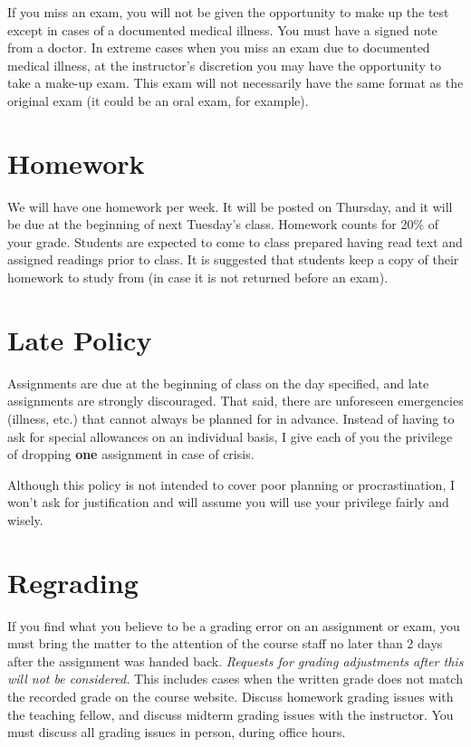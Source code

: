 \documentclass[11pt]{article}
\begin{document}
If you miss an exam, you will not be given the opportunity to make up the test
except in cases of a documented medical illness.  You must have a signed note
from a doctor.  In extreme cases when you miss an exam due to documented
medical illness, at the instructor's discretion you may have the opportunity
to take a make-up exam.  This exam will not necessarily have the same format
as the original exam (it could be an oral exam, for example).

\section*{Homework}
We will have one homework per week. It will be posted on Thursday, and it will be due at the beginning of next Tuesday's class. 
Homework counts for 20\% of your grade.  
Students are expected to come to class prepared having read text and assigned
readings prior to class. It is
suggested that students keep a copy of their homework to study from (in case
it is not returned before an exam). 


\section*{Late Policy}

Assignments are due at the beginning of class on the day specified, and late
assignments are strongly discouraged.  That said, there are unforeseen
emergencies (illness, etc.) that cannot always be planned for in advance. 
Instead of having to ask for special allowances on an individual basis, I
give each of you the privilege of dropping \textbf{one} assignment in case of crisis. 

Although this policy is not intended to cover poor planning or procrastination,
I won't ask for justification and will assume you will use your privilege  fairly and wisely.  


\section*{Regrading}

If you find what you believe to be a grading error on an assignment or exam,
you must bring the matter to the attention of the course staff no later than 2
days after the assignment was handed back.  \emph{Requests for grading
adjustments after this will not be considered.}  This includes cases when the
written grade does not match the recorded grade on the course website.
Discuss homework grading issues with the teaching fellow, and discuss midterm
grading issues with the instructor.  You must discuss all grading issues in
person, during office hours.
\end{document}
